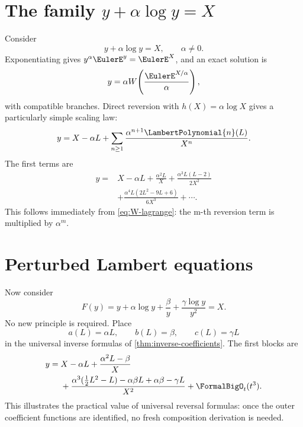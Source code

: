 \documentclass[11pt,openany]{book}
\theoremstyle{definition}
\theoremstyle{plain}
\theoremstyle{remark}
\begin{document}
\section{The family \texorpdfstring{\(y+\alpha\log y=X\)}{y + alpha log y = X}}
Consider
\begin{equation}\label{eq:alpha-log-inversion}
 y+\alpha\log y=X,
 \qquad \alpha\ne0.
\end{equation}
Exponentiating gives \(y^\alpha\EulerE^y=\EulerE^X\), and an exact solution is
\begin{equation}\label{eq:alpha-exact-W}
 y=\alpha W\!\left(\frac{\EulerE^{X/\alpha}}{\alpha}\right),
\end{equation}
with compatible branches.  Direct reversion with \(h(X)=\alpha\log X\) gives a
particularly simple scaling law:
\begin{equation}\label{eq:alpha-expansion}
 y=X-\alpha L+
 \sum_{n\ge1}\frac{\alpha^{n+1}\LambertPolynomial{n}(L)}{X^n}.
\end{equation}
The first terms are
\begin{equation}\label{eq:alpha-first-terms}
\begin{split}
 y={}&X-\alpha L+\frac{\alpha^2L}{X}
 +\frac{\alpha^3L(L-2)}{2X^2}\\
 &+\frac{\alpha^4L(2L^2-9L+6)}{6X^3}+\cdots.
\end{split}
\end{equation}
This follows immediately from \cref{eq:W-lagrange}: the m-th reversion term is
multiplied by \(\alpha^m\).

\section{Perturbed Lambert equations}
Now consider
\begin{equation}\label{eq:perturbed-Lambert}
 F(y)=y+\alpha\log y+\frac{\beta}{y}+\frac{\gamma\log y}{y^2}=X.
\end{equation}
No new principle is required.  Place
\[
 a(L)=\alpha L,
 \qquad b(L)=\beta,
 \qquad c(L)=\gamma L
\]
in the universal inverse formulas of \cref{thm:inverse-coefficients}.  The
first blocks are
\begin{equation}\label{eq:perturbed-Lambert-inverse}
\begin{split}
 y={}&X-\alpha L+\frac{\alpha^2L-\beta}{X}\\
 &+\frac{\alpha^3(\tfrac12L^2-L)-\alpha\beta L+\alpha\beta-\gamma L}{X^2}
 +\FormalBigO_t(t^3).
\end{split}
\end{equation}
This illustrates the practical value of universal reversal formulas: once the
outer coefficient functions are identified, no fresh composition derivation is
needed.
\end{document}
